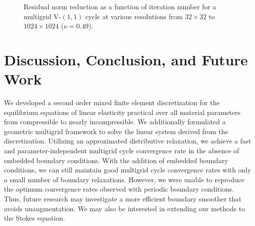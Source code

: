\setlength{\figurewidth}{0.45\columnwidth}
\begin{figure}[htbp]
\begin{center}
\caption{Residual norm reduction as a function of iteration number for a multigrid V-$(1,1)$ cycle at various resolutions from $32 \times 32$ to $1024 \times 1024$ ($\nu = 0.49$).}
\label{fig:ch5.multigrid.convergence.flower.b}
\end{center}
\end{figure}

\section{Discussion, Conclusion, and Future Work}

We developed a second order mixed finite element discretization for the equilibrium equations of linear elasticity practical over all material parameters from compressible to nearly incompressible. We additionally formulated a geometric multigrid framework to solve the linear system derived from the discretization. Utilizing an approximated distributive relaxation, we achieve a fast and parameter-independent multigrid cycle convergence rate in the absence of embedded boundary conditions. With the addition of embedded boundary conditions, we can still maintain good multigrid cycle convergence rates with only a small number of boundary relaxations. However, we were unable to reproduce the optimum convergence rates observed with periodic boundary conditions. Thus, future research may investigate a more efficient boundary smoother that avoids unaugmentation. We may also be interested in extending our methods to the Stokes equation.
